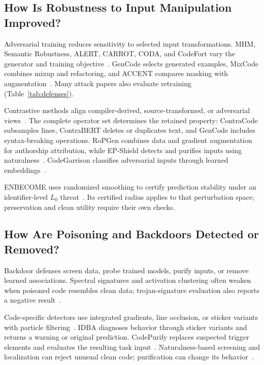 \documentclass[acmsmall,screen,review,nonacm]{acmart}
\begin{document}
\subsection{How Is Robustness to Input Manipulation Improved?} \label{sec:defense:robust}
Adversarial training reduces sensitivity to selected input transformations. MHM, Semantic Robustness, ALERT, CARROT, CODA, and CodeFort vary the generator and training objective~\cite{zhang2020generating,ramakrishnan2022semantic,yang2022natural,zhang2022carrot,tian2023coda,zhang2024codefort}. GenCode selects generated examples, MixCode combines mixup and refactoring, and ACCENT compares masking with augmentation~\cite{gencode2024,dong2023mixcode,zhou2022accent}. Many attack papers also evaluate retraining (Table~\ref{tab:defenses}).

Contrastive methods align compiler-derived, source-transformed, or adversarial views~\cite{jain2021contracode,jia2023clawsat,liu2023contrabert,ding2022disco}. The complete operator set determines the retained property: ContraCode subsamples lines, ContraBERT deletes or duplicates text, and GenCode includes syntax-breaking operations. RoPGen combines data and gradient augmentation for authorship attribution, while EP-Shield detects and purifies inputs using naturalness~\cite{li2022ropgen,mu2025epshield}. CodeGarrison classifies adversarial inputs through learned embeddings~\cite{ghannoum2025codegarrison}.

ENBECOME uses randomized smoothing to certify prediction stability under an identifier-level $L_0$ threat~\cite{han2026enbecome}. Its certified radius applies to that perturbation space; preservation and clean utility require their own checks.

\subsection{How Are Poisoning and Backdoors Detected or Removed?} \label{sec:defense:poison}
Backdoor defenses screen data, probe trained models, purify inputs, or remove learned associations. Spectral signatures and activation clustering often weaken when poisoned code resembles clean data; trojan-signature evaluation also reports a negative result~\cite{ramakrishnan2022backdoors,wan2022yousee,schuster2021autocomplete,hussain2024trojan}.

Code-specific detectors use integrated gradients, line occlusion, or sticker variants with particle filtering~\cite{li2024codepoisoner,hussain2025oseql,qu2024idba}. IDBA diagnoses behavior through sticker variants and returns a warning or original prediction. CodePurify replaces suspected trigger elements and evaluates the resulting task input~\cite{mu2024codepurify}. Naturalness-based screening and localization can reject unusual clean code; purification can change its behavior~\cite{sun2025killbadcode,depa2025}.
\end{document}

